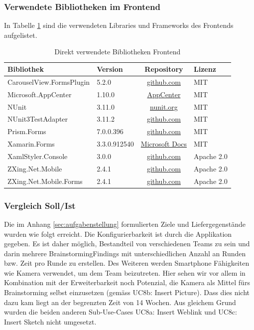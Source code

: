 \subsubsection{Verwendete Bibliotheken im Frontend}
In Tabelle \ref{tab:verwendete-libraries-frontend} sind die verwendeten Libraries und Frameworks des Frontends aufgelistet.
\begin{table}[!h]
	\centering
	\begin{tabular}{| l | l | c | l |}
		\hline
		\textbf{Bibliothek} & \textbf{Version} & \textbf{Repository} & \textbf{Lizenz}\\
		\hline
		CarouselView.FormsPlugin & 5.2.0 & \href{https://github.com/alexrainman/CarouselView}{github.com} & MIT \\
		Microsoft.AppCenter & 1.10.0 & \href{https://visualstudio.microsoft.com/app-center/}{AppCenter} & MIT \\
		NUnit & 3.11.0 & \href{http://nunit.org}{nunit.org} & MIT\\
		NUnit3TestAdapter & 3.11.2 & \href{https://github.com/nunit/docs/wiki/Visual-Studio-Test-Adapter}{github.com} & MIT\\
		Prism.Forms & 7.0.0.396 & \href{https://github.com/PrismLibrary/Prism}{github.com} & MIT \\
		Xamarin.Forms & 3.3.0.912540 & \href{https://docs.microsoft.com/en-us/xamarin/xamarin-forms/}{Microsoft Docs} & MIT \\
		XamlStyler.Console & 3.0.0 & 
		\href{https://github.com/Xavalon/XamlStyler}{github.com} & Apache 2.0\\
		ZXing.Net.Mobile & 2.4.1 & \href{http://github.com/Redth/ZXing.Net.Mobile}{github.com} & Apache 2.0\\
		ZXing.Net.Mobile.Forms & 2.4.1 &
		\href{http://github.com/Redth/ZXing.Net.Mobile}{github.com} & Apache 2.0\\
		\hline
	\end{tabular}
	\caption{Direkt verwendete Bibliotheken Frontend}
	\label{tab:verwendete-libraries-frontend}
\end{table}


\subsubsection{Vergleich Soll/Ist}\label{subsub:vergleich-soll-ist}
Die im Anhang \ref{sec:aufgabenstellung} formulierten Ziele und Liefergegenstände wurden wie folgt erreicht. Die Konfigurierbarkeit ist durch die Applikation gegeben. Es ist daher möglich, Bestandteil von verschiedenen Teams zu sein und darin mehrere BrainstormingFindings mit unterschiedlichen Anzahl an Runden bzw. Zeit pro Runde zu erstellen. Des Weiteren werden Smartphone Fähigkeiten wie Kamera verwendet, um dem Team beizutreten. Hier sehen wir vor allem in Kombination mit der Erweiterbarkeit noch Potenzial, die Kamera als Mittel fürs Brainstorming selbst einzusetzen (gemäss UC8b: Insert Picture). Dass dies nicht dazu kam liegt an der begrenzten Zeit von 14 Wochen. Aus gleichem Grund wurden die beiden anderen Sub-Use-Cases UC8a: Insert Weblink und UC8c: Insert Sketch nicht umgesetzt.


